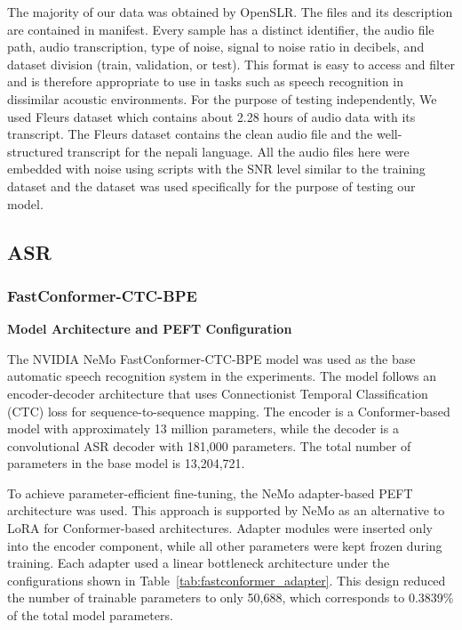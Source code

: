 The majority of our data was obtained by OpenSLR. The files and its description are contained in manifest. Every sample has a distinct identifier, the audio file path, audio transcription, type of noise, signal to noise ratio in decibels, and dataset division (train, validation, or test). This format is easy to access and filter and is therefore appropriate to use in tasks such as speech recognition in dissimilar acoustic environments. For the purpose of testing independently, We used Fleurs dataset which contains about 2.28 hours of audio data with its transcript. The Fleurs dataset contains the clean audio file and the well-structured transcript for the nepali language. All the audio files here were embedded with noise using scripts with the SNR level similar to the training dataset and the dataset was used specifically for the purpose of testing our model.

\subsection{ASR}
\subsubsection{FastConformer-CTC-BPE}

\textbf{Model Architecture and PEFT Configuration}

The NVIDIA NeMo FastConformer-CTC-BPE model was used as the base automatic speech recognition system in the experiments. The model follows an encoder-decoder architecture that uses Connectionist Temporal Classification (CTC) loss for sequence-to-sequence mapping. The encoder is a Conformer-based model with approximately 13 million parameters, while the decoder is a convolutional ASR decoder with 181,000 parameters. The total number of parameters in the base model is 13,204,721.

To achieve parameter-efficient fine-tuning, the NeMo adapter-based PEFT architecture was used. This approach is supported by NeMo as an alternative to LoRA for Conformer-based architectures. Adapter modules were inserted only into the encoder component, while all other parameters were kept frozen during training. Each adapter used a linear bottleneck architecture under the configurations shown in Table~\ref{tab:fastconformer_adapter}. This design reduced the number of trainable parameters to only 50,688, which corresponds to 0.3839\% of the total model parameters.

